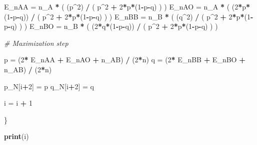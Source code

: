 \documentclass[]{article}
\newenvironment{Shaded}{\begin{snugshade}}{\end{snugshade}}
\newcommand{\KeywordTok}[1]{\textcolor[rgb]{0.13,0.29,0.53}{\textbf{#1}}}
\newcommand{\DecValTok}[1]{\textcolor[rgb]{0.00,0.00,0.81}{#1}}
\newcommand{\StringTok}[1]{\textcolor[rgb]{0.31,0.60,0.02}{#1}}
\newcommand{\CommentTok}[1]{\textcolor[rgb]{0.56,0.35,0.01}{\textit{#1}}}
\newcommand{\OperatorTok}[1]{\textcolor[rgb]{0.81,0.36,0.00}{\textbf{#1}}}
\newcommand{\NormalTok}[1]{#1}
\begin{document}
\begin{Shaded}
\begin{Highlighting}[]
\NormalTok{        E_nAA =}\StringTok{ }\NormalTok{n_A }\OperatorTok{*}\StringTok{ }\NormalTok{( (p}\OperatorTok{^}\DecValTok{2}\NormalTok{) }\OperatorTok{/}\StringTok{ }\NormalTok{( p}\OperatorTok{^}\DecValTok{2} \OperatorTok{+}\StringTok{ }\DecValTok{2}\OperatorTok{*}\NormalTok{p}\OperatorTok{*}\NormalTok{(}\DecValTok{1}\OperatorTok{-}\NormalTok{p}\OperatorTok{-}\NormalTok{q) ) )}
\NormalTok{        E_nAO =}\StringTok{ }\NormalTok{n_A }\OperatorTok{*}\StringTok{ }\NormalTok{( (}\DecValTok{2}\OperatorTok{*}\NormalTok{p}\OperatorTok{*}\NormalTok{(}\DecValTok{1}\OperatorTok{-}\NormalTok{p}\OperatorTok{-}\NormalTok{q)) }\OperatorTok{/}\StringTok{ }\NormalTok{( p}\OperatorTok{^}\DecValTok{2} \OperatorTok{+}\StringTok{ }\DecValTok{2}\OperatorTok{*}\NormalTok{p}\OperatorTok{*}\NormalTok{(}\DecValTok{1}\OperatorTok{-}\NormalTok{p}\OperatorTok{-}\NormalTok{q) ) )}
\NormalTok{        E_nBB =}\StringTok{ }\NormalTok{n_B }\OperatorTok{*}\StringTok{ }\NormalTok{( (q}\OperatorTok{^}\DecValTok{2}\NormalTok{) }\OperatorTok{/}\StringTok{ }\NormalTok{( p}\OperatorTok{^}\DecValTok{2} \OperatorTok{+}\StringTok{ }\DecValTok{2}\OperatorTok{*}\NormalTok{p}\OperatorTok{*}\NormalTok{(}\DecValTok{1}\OperatorTok{-}\NormalTok{p}\OperatorTok{-}\NormalTok{q) ) )}
\NormalTok{        E_nBO =}\StringTok{ }\NormalTok{n_B }\OperatorTok{*}\StringTok{ }\NormalTok{( (}\DecValTok{2}\OperatorTok{*}\NormalTok{q}\OperatorTok{*}\NormalTok{(}\DecValTok{1}\OperatorTok{-}\NormalTok{p}\OperatorTok{-}\NormalTok{q)) }\OperatorTok{/}\StringTok{ }\NormalTok{( p}\OperatorTok{^}\DecValTok{2} \OperatorTok{+}\StringTok{ }\DecValTok{2}\OperatorTok{*}\NormalTok{p}\OperatorTok{*}\NormalTok{(}\DecValTok{1}\OperatorTok{-}\NormalTok{p}\OperatorTok{-}\NormalTok{q) ) )}
        
        \CommentTok{# Maximization step}
        
\NormalTok{        p =}\StringTok{ }\NormalTok{(}\DecValTok{2}\OperatorTok{*}\StringTok{ }\NormalTok{E_nAA }\OperatorTok{+}\StringTok{ }\NormalTok{E_nAO }\OperatorTok{+}\StringTok{ }\NormalTok{n_AB) }\OperatorTok{/}\StringTok{ }\NormalTok{(}\DecValTok{2}\OperatorTok{*}\NormalTok{n) }
\NormalTok{        q =}\StringTok{ }\NormalTok{(}\DecValTok{2}\OperatorTok{*}\StringTok{ }\NormalTok{E_nBB }\OperatorTok{+}\StringTok{ }\NormalTok{E_nBO }\OperatorTok{+}\StringTok{ }\NormalTok{n_AB) }\OperatorTok{/}\StringTok{ }\NormalTok{(}\DecValTok{2}\OperatorTok{*}\NormalTok{n)}
        
\NormalTok{        p_N[i}\OperatorTok{+}\DecValTok{2}\NormalTok{] =}\StringTok{ }\NormalTok{p}
\NormalTok{        q_N[i}\OperatorTok{+}\DecValTok{2}\NormalTok{] =}\StringTok{ }\NormalTok{q}
      
\NormalTok{        i =}\StringTok{ }\NormalTok{i }\OperatorTok{+}\StringTok{ }\DecValTok{1}
  
\NormalTok{\}}

\KeywordTok{print}\NormalTok{(i)}
\end{Highlighting}
\end{Shaded}
\end{document}
